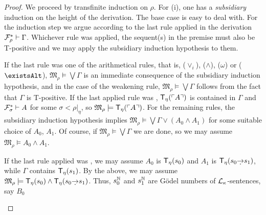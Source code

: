 \documentclass[UKenglish,cleveref,DIV=12]{scrartcl}
\let\exists\existsAlt
\theoremstyle{definition}
\theoremstyle{definition}
\begin{document}
\begin{proof}
We proceed by transfinite induction on $\rho$. For (i), one has a {\em
subsidiary} induction on the height of the derivation. The base case is easy to
deal with. For the induction step we argue according to the last rule applied in
the derivation $\mathcal{F}^*_\rho\vdash\Gamma$. Whichever rule was applied, the sequent(s) in the premise must also be T-positive and we may apply the subsidiary induction hypothesis to them.

If the last rule was one of the arithmetical rules, that is, ($\lor_i$),
($\land$), ($\omega$) or ($\exists$),
$\mathfrak{M}_\rho\models\bigvee\Gamma$ is an immediate consequence of the
subsidiary induction hypothesis, and in the case of the weakening rule,
$\mathfrak{M}_\rho\models\bigvee\Gamma$ follows from the fact that $\Gamma$ is
T-positive. If the last applied rule was \Nec\eta, $\mathsf{T}_\eta(\ulcorner{A}\urcorner)$ is
contained in $\Gamma$ and $\mathcal{F}^*_\sigma\vdash A$ for some %
$\sigma<\rho|_\eta$, so $\mathfrak{M}_\rho\models \mathsf{T}_\eta(\ulcorner{A}\urcorner)$.
For the remaining rules, the subsidiary induction hypothesis implies
$\mathfrak{M}_\rho\models\bigvee\Gamma\lor(A_0\land A_1)$ for some suitable
choice of $A_0$, $A_1$.
Of course, if
$\mathfrak{M}_\rho\models\bigvee\Gamma$ we are done, so we may assume
$\mathfrak{M}_\rho\models A_0\land A_1$.
\begin{description}\renewcommand*\labelitemi{--}%
\item [\normalfont{}\Imp\eta.] If the last rule applied was \Imp\eta, we may
  assume $A_0$ is $\mathsf{T}_\eta(s_0)$ and $A_1$ is $\T_\eta(s_0\dimplies s_1)$, while
  $\Gamma$ contains $\mathsf{T}_\eta(s_1)$. By the above, we may assume
  $\mathfrak{M}_\rho\models \T_\eta(s_0)\land \T_\eta(s_0\dimplies s_1)$. Thus,
  $s_0^\mathbb N$ and $s_1^\mathbb N$ are Gödel numbers of $\mathcal{L}_\kappa$-sentences, say $B_0$

\end{description}
\end{proof}
\end{document}
